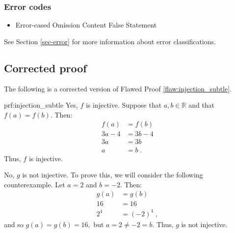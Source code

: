  
\subsubsection{Error codes}
\begin{itemize}
	\item 	Error-cased Omission Content False Statement
\end{itemize}
See Section \ref{sec-error} for more information about error classifications.

\clearpage
\subsection{Corrected proof}

The following is a corrected version of Flawed Proof \ref{flaw:injection_subtle}. %

\begin{prf}{prf:injection_subtle} %
Yes, $f$ is injective. Suppose that $a, b \in \mathbb{R}$ and that $f(a) = f(b)$. Then:
\begin{align*}
    f(a) &= f(b) \\
    3a-4 &= 3b-4 \\
    3a &= 3b \\
    a &= b\;.
\end{align*}
Thus, $f$ is injective. 

No, $g$ is not injective. To prove this, we will consider the following counterexample. Let $a = 2$ and $b=-2$. Then:
\begin{align*}
    g(a) &= g(b) \\
    16 &= 16 \\
    2^4 &= (-2)^4\;,
\end{align*}
and so $g(a)=g(b)=16,$ but $a=2 \neq -2 = b$. Thus, $g$ is not injective. 
\end{prf}
